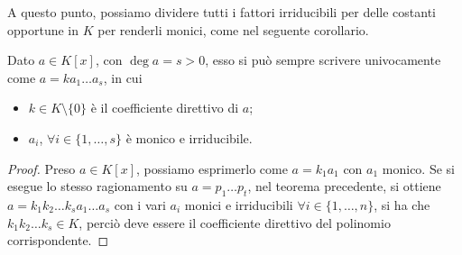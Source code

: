 A questo punto, possiamo dividere tutti i fattori irriducibili per delle costanti opportune in $K$ per renderli monici, come nel seguente corollario.
\begin{corollario} \label{c:fattorizzazione-polinomi-monici}
	Dato $a\in K[x]$, con $\deg a=s>0$, esso si può sempre scrivere univocamente come $a=ka_1\dots a_s$, in cui
	\begin{itemize}
		\item $k\in K\setminus\{0\}$ è il coefficiente direttivo di $a$;
		\item $a_i$, $\forall i\in\{1,\dots,s\}$ è monico e irriducibile.
	\end{itemize}
\end{corollario}
\begin{proof}
	Preso $a\in K[x]$, possiamo esprimerlo come $a=k_1a_1$ con $a_1$ monico.
	Se si esegue lo stesso ragionamento su $a=p_1\dots p_t$, nel teorema precedente, si ottiene $a=k_1k_2\dots k_sa_1\dots a_s$ con i vari $a_i$ monici e irriducibili $\forall i\in\{1,\dots,n\}$, si ha che $k_1k_2\dots k_s\in K$, perciò deve essere il coefficiente direttivo del polinomio corrispondente.
\end{proof}   

